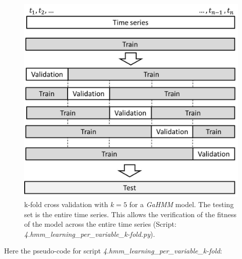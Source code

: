 \begin{figure}[h!]
  \vspace{0.5em} %
  \includegraphics[scale=0.45]{Figures/k-fold-2.jpg}
  \caption{k-fold cross validation with $k=5$ for a \textit{GaHMM} model. The testing set is the entire time series. This allows the verification of the fitness of the model across the
entire time series (Script: \textit{4.hmm\_learning\_per\_variable\_k-fold.py}).}
  \label{fig:k-fold-2}
\end{figure}

Here the pseudo-code for script \textit{ 4.hmm\_learning\_per\_variable\_k-fold}: 

